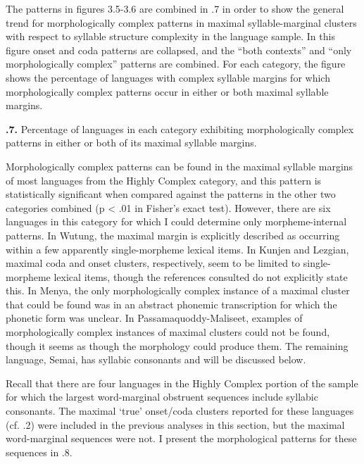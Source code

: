   The patterns in figures 3.5-3.6 are combined in .7 in order to show the general trend for morphologically complex patterns in maximal syllable-marginal clusters with respect to syllable structure complexity in the language sample. In this figure onset and coda patterns are collapsed, and the “both contexts” and “only morphologically complex” patterns are combined. For each category, the figure shows the percentage of languages with complex syllable margins for which morphologically complex patterns occur in either or both maximal syllable margins.





\textbf{.7.} Percentage of languages in each category exhibiting morphologically complex patterns in either or both of its maximal syllable margins.



  Morphologically complex patterns can be found in the maximal syllable margins of most languages from the Highly Complex category, and this pattern is statistically significant when compared against the patterns in the other two categories combined (p < .01 in Fisher’s exact test). However, there are six languages in this category for which I could determine only morpheme-internal patterns. In Wutung, the maximal margin is explicitly described as occurring within a few apparently single-morpheme lexical items. In Kunjen and Lezgian, maximal coda and onset clusters, respectively, seem to be limited to single-morpheme lexical items, though the references consulted do not explicitly state this. In Menya, the only morphologically complex instance of a maximal cluster that could be found was in an abstract phonemic transcription for which the phonetic form was unclear. In Passamaquoddy-Maliseet, examples of morphologically complex instances of maximal clusters could not be found, though it seems as though the morphology could produce them. The remaining language, Semai, has syllabic consonants and will be discussed below.



  Recall that there are four languages in the Highly Complex portion of the sample for which the largest word-marginal obstruent sequences include syllabic consonants. The maximal ‘true’ onset/coda clusters reported for these languages (cf. .2) were included in the previous analyses in this section, but the maximal word-marginal sequences were not. I present the morphological patterns for these sequences in .8.







